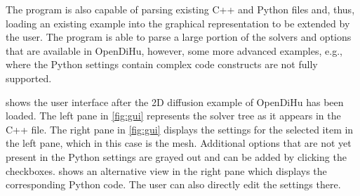 The program is also capable of parsing existing C++ and Python files and, thus, loading an existing example into the graphical representation to be extended by the user. The program is able to parse a large portion of the solvers and options that are available in OpenDiHu, however, some more advanced examples, e.g., where the Python settings contain complex code constructs are not fully supported.

 shows the user interface after the 2D diffusion example of OpenDiHu has been loaded. The left pane in \cref{fig:gui} represents the solver tree as it appears in the C++ file. The right pane in \cref{fig:gui} displays the settings for the selected item in the left pane, which in this case is the mesh. Additional options that are not yet present in the Python settings are grayed out and can be added by clicking the checkboxes.
 shows an alternative view in the right pane which displays the corresponding Python code. The user can also directly edit the settings there.

